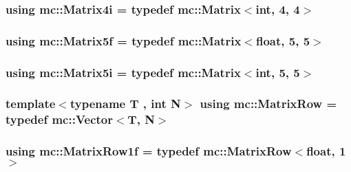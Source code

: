 \subsubsection[{\texorpdfstring{Matrix4i}{Matrix4i}}]{\setlength{\rightskip}{0pt plus 5cm}using {\bf mc\+::\+Matrix4i} = typedef {\bf mc\+::\+Matrix}$<$int, 4, 4$>$}\hypertarget{namespacemc_a2b5b12e5123fac956ab87c789991537e}{}\label{namespacemc_a2b5b12e5123fac956ab87c789991537e}
\subsubsection[{\texorpdfstring{Matrix5f}{Matrix5f}}]{\setlength{\rightskip}{0pt plus 5cm}using {\bf mc\+::\+Matrix5f} = typedef {\bf mc\+::\+Matrix}$<$float, 5, 5$>$}\hypertarget{namespacemc_ab12faae3cb1ef53b80a57c8586134343}{}\label{namespacemc_ab12faae3cb1ef53b80a57c8586134343}
\subsubsection[{\texorpdfstring{Matrix5i}{Matrix5i}}]{\setlength{\rightskip}{0pt plus 5cm}using {\bf mc\+::\+Matrix5i} = typedef {\bf mc\+::\+Matrix}$<$int, 5, 5$>$}\hypertarget{namespacemc_ae1c885363bd63ce278b21e95350ca637}{}\label{namespacemc_ae1c885363bd63ce278b21e95350ca637}
\subsubsection[{\texorpdfstring{Matrix\+Row}{MatrixRow}}]{\setlength{\rightskip}{0pt plus 5cm}template$<$typename T , int N$>$ using {\bf mc\+::\+Matrix\+Row} = typedef {\bf mc\+::\+Vector}$<$T, N$>$}\hypertarget{namespacemc_a864ada9f6799e62e26d4b02bbd1ac4c2}{}\label{namespacemc_a864ada9f6799e62e26d4b02bbd1ac4c2}
\subsubsection[{\texorpdfstring{Matrix\+Row1f}{MatrixRow1f}}]{\setlength{\rightskip}{0pt plus 5cm}using {\bf mc\+::\+Matrix\+Row1f} = typedef {\bf mc\+::\+Matrix\+Row}$<$float, 1$>$}\hypertarget{namespacemc_a5a0f82f5a673329409088bb9dd2d7f7b}{}\label{namespacemc_a5a0f82f5a673329409088bb9dd2d7f7b}
